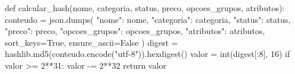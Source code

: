 
\begin{codigo}[language=Python, breaklines=true, caption={Cálculo da impressão digital do item.}, label={lst:hash}]
def calcular_hash(nome, categoria, status, preco, opcoes_grupos, atributos):
    conteudo = json.dumps(
        {"nome": nome, "categoria": categoria, "status": status,
         "preco": preco, "opcoes_grupos": opcoes_grupos, "atributos": atributos},
        sort_keys=True, ensure_ascii=False
    )
    digest = hashlib.md5(conteudo.encode("utf-8")).hexdigest()
    valor = int(digest[:8], 16)
    if valor >= 2**31:
        valor -= 2**32
    return valor
\end{codigo}

